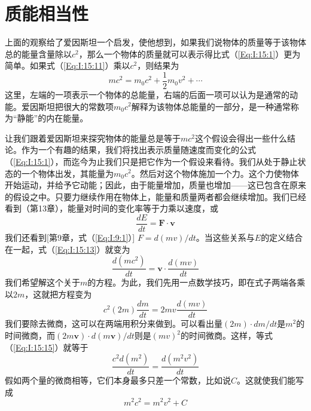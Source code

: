 \section{质能相当性}

上面的观察给了爱因斯坦一个启发，使他想到，如果我们说物体的质量等于该物体总的能量含量除以$c^2$，那么一个物体的质量就可以表示得比式（\ref{Eq:I:15:1}）更为简单。如果式（\ref{Eq:I:15:11}）乘以$c^2$，则结果为
\begin{equation}
    \label{Eq:I:15:12}
    mc^2=m_0c^2+\frac{1}{2}m_0v^2+\cdots
\end{equation}
这里，左端的一项表示一个物体的总能量，右端的后面一项可以认为是通常的动能。爱因斯坦把很大的常数项$m_0c^2$解释为该物体总能量的一部分，是一种通常称为“静能”的内在能量。

让我们跟着爱因斯坦来探究物体的能量总是等于$mc^2$这个假设会得出一些什么结论。作为一个有趣的结果，我们将找出表示质量随速度而变化的公式（\ref{Eq:I:15:1}），而迄今为止我们只是把它作为一个假设来看待。我们从处于静止状态的一个物体出发，其能量为$m_0c^2$。然后对这个物体施加一个力。这个力使物体开始运动，并给予它动能；因此，由于能量增加，质量也增加——这已包含在原来的假设之中。只要力继续作用在物体上，能量和质量两者都会继续增加。我们已经看到（第13章），能量对时间的变化率等于力乘以速度，或
\begin{equation}
    \label{Eq:I:15:13}
    \frac{dE}{dt}=\boldsymbol{F} \cdot \boldsymbol{v}
\end{equation}
我们还看到[第9章，式（\ref{Eq:I:9:1}）] $F=d(mv)/dt$。当这些关系与$E$的定义结合在一起，式（\ref{Eq:I:15:13}）就变为
\begin{equation}
    \label{Eq:I:15:14}
    \frac{d(mc^2)}{dt}=\boldsymbol{v} \cdot \frac{d(mv)}{dt}
\end{equation}
我们希望解这个关于$m$的方程。为此，我们先用一点数学技巧，即在式子两端各乘以$2m$，这就把方程变为
\begin{equation}
    \label{Eq:I:15:15}
    c^2(2m)\frac{dm}{dt}=2mv \frac{d(mv)}{dt}
\end{equation}
我们要除去微商，这可以在两端用积分来做到。可以看出量$(2m)\cdot dm/dt$是$m^2$的时间微商，而$(2m\boldsymbol{v}) \cdot d(m\boldsymbol{v})/dt$则是$(mv)^2$的时间微商。这样，等式（\ref{Eq:I:15:15}）就等于
\begin{equation}
    \label{Eq:I:15:16}
    \frac{c^2d(m^2)}{dt}=\frac{d(m^2v^2)}{dt}
\end{equation}
假如两个量的微商相等，它们本身最多只差一个常数，比如说$C$。这就使我们能写成
\begin{equation}
    \label{Eq:I:15:17}
    m^2c^2=m^2v^2+C
\end{equation}
